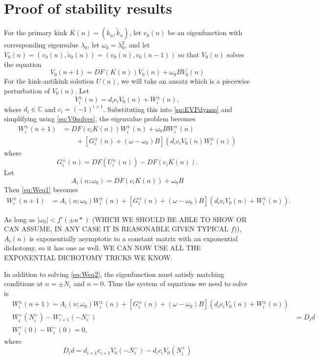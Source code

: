\documentclass[12pt]{article}
\def\C{{\mathbb C}}
\begin{document}
\section{Proof of stability results}

For the primary kink $K(n) = (k_n, \tilde{k}_n)$, let $v_0(n)$ be an eigenfunction with corresponding eigenvalue $\lambda_0$, let $\omega_0 = \lambda_0^2$, and let $V_0(n) = (v_0(n), \tilde{v}_0(n)) = (v_0(n), v_0(n-1))$ so that $V_0(n)$ solves the equation
\begin{equation}\label{eq:V0solves}
V_0(n+1) = D F( K(n) )V_0(n) + \omega_0 B V_0(n)
\end{equation}
For the kink-antikink solution $U(n)$, we will take an ansatz which is a piecewise perturbation of $V_0(n)$. Let
\begin{equation}\label{eq:Viansatz}
V_i^\pm(n) = d_i c_i V_0(n) + W_i^\pm(n),
\end{equation}
where $d_i \in \C$ and $c_i = (-1)^{i+1}$. Substituting this into \cref{eq:EVPdyneq} and simplifying using \cref{eq:V0solves}, the eigenvalue problem becomes
\begin{equation}\label{eq:Weq1}
\begin{aligned}
W_i^\pm(n+1)
&= DF(c_i K(n)) W_i^\pm(n) + \omega_0 B W_i^\pm(n) \\
&\qquad + [G_i^\pm(n) + (\omega - \omega_0) B](d_i c_i V_0(n) W_i^\pm(n))
\end{aligned}
\end{equation}
where
\[
G_i^\pm(n) = DF(U_i^\pm(n)) - DF(c_i K(n)).
\]
Let 
\[
A_i(n; \omega_0) = DF(c_i K(n)) + \omega_0 B
\]
Then \cref{eq:Weq1} becomes
\begin{align}\label{eq:Weq2}
W_i^\pm(n+1)
&= A_i(n; \omega_0) W_i^\pm(n) + [G_i^\pm(n) + (\omega - \omega_0) B](d_i c_i V_0(n) + W_i^\pm(n)).
\end{align}

As long as $|\omega_0| < f'(\pm u*)$ (WHICH WE SHOULD BE ABLE TO SHOW OR CAN ASSUME, IN ANY CASE IT IS REASONABLE GIVEN TYPICAL $f)$), $A_i(n)$ is exponentially asymptotic to a constant matrix with an exponential dichotomy, so it has one as well. WE CAN NOW USE ALL THE EXPONENTIAL DICHOTOMY TRICKS WE KNOW.

In addition to solving \cref{eq:Weq2}, the eigenfunction must satisfy matching conditions at $n = \pm N_i$ and $n = 0$. Thus the system of equations we need to solve is
\begin{equation}\label{eq:eigWsystem1}
\begin{aligned}
& W_i^\pm(n+1)
= A_i(n; \omega_0) W_i^\pm(n) + [G_i^\pm(n) + (\omega - \omega_0) B](d_i c_i V_0(n) + W_i^\pm(n))\\
& W_i^+(N_i^+) - W_{i+1}^-(-N_i^-) &= D_i d \\
& W_i^+(0) - W_i^-(0) = 0,
\end{aligned}
\end{equation}
where
\begin{equation}\label{defDid}
D_i d = d_{i+1} c_{i+1} V_0(-N_i^-) - d_i c_i V_0(N_i^+)
\end{equation}
\end{document}
